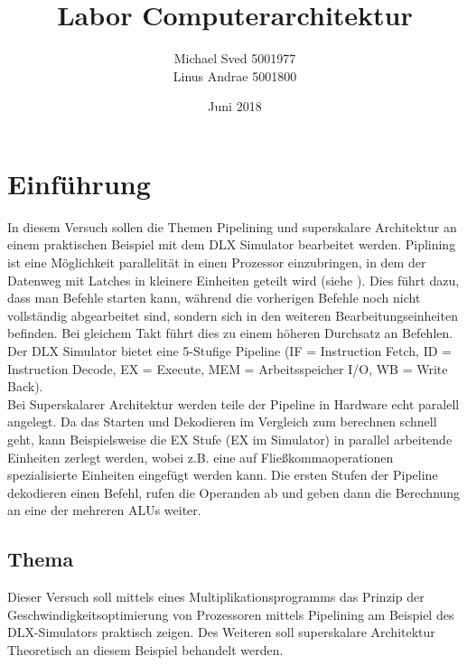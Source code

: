 \documentclass[a4paper,ngerman]{scrartcl}
\title{Labor Computerarchitektur}
\subtitle{\subtitletext}
\author{Michael Sved  5001977\\ Linus Andrae 5001800}
\date{Juni 2018}
\begin{document}
% 
% 


\newcommand{\einfuehrungstext}{In diesem Versuch sollen die Themen Pipelining und superskalare Architektur an einem praktischen Beispiel mit dem DLX Simulator bearbeitet werden. 
Piplining ist eine Möglichkeit parallelität in einen Prozessor einzubringen, in dem der Datenweg mit Latches in kleinere Einheiten geteilt wird (siehe \cite[S. 314]{TaneRech2014}). Dies führt dazu, dass man Befehle starten kann, während die vorherigen Befehle noch nicht vollständig abgearbeitet sind, sondern sich in den weiteren Bearbeitungseinheiten befinden.
Bei gleichem Takt führt dies zu einem höheren Durchsatz an Befehlen. \\
Der DLX Simulator bietet eine 5-Stufige Pipeline (IF = Instruction Fetch, ID = Instruction Decode, EX = Execute, MEM = Arbeitsspeicher I/O, WB = Write Back). \\
Bei Superskalarer Architektur werden teile der Pipeline in Hardware echt paralell angelegt. Da das Starten und Dekodieren im Vergleich zum berechnen schnell geht, kann Beispielsweise die EX Stufe (EX im Simulator) in parallel arbeitende Einheiten zerlegt werden, wobei z.B. eine auf Fließkommaoperationen spezialisierte Einheiten eingefügt werden kann. Die ersten Stufen der Pipeline dekodieren einen Befehl, rufen die Operanden ab und geben dann die Berechnung an eine der mehreren ALUs weiter. }


\maketitle
\thispagestyle{empty}
\tableofcontents
\newpage
\setcounter{page}{1}
\section{Einführung}
\einfuehrungstext
\subsection{Thema}
Dieser Versuch soll mittels eines Multiplikationsprogramms das Prinzip der Geschwindigkeitsoptimierung von Prozessoren mittels Pipelining am Beispiel des DLX-Simulators praktisch zeigen. 
Des Weiteren soll superskalare Architektur Theoretisch an diesem Beispiel behandelt werden. 
\end{document}
